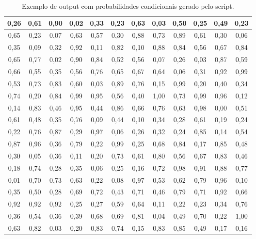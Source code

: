 \begin{table}[H]
\caption{Exemplo de output com probabilidades condicionais gerado pelo script.}
\label{q.output1}
\centering

\begin{tabular}{|c|c|c|c|c|c|c|c|c|c|c|c|}
\hline
0,26 & 0,61 & 0,90 & 0,02 & 0,33 & 0,23 & 0,63 & 0,03 & 0,50 & 0,25 & 0,49 & 0,23 \\ \hline
0,65 & 0,23 & 0,07 & 0,63 & 0,57 & 0,30 & 0,88 & 0,73 & 0,89 & 0,61 & 0,30 & 0,06 \\ \hline
0,35 & 0,09 & 0,32 & 0,92 & 0,11 & 0,82 & 0,10 & 0,88 & 0,84 & 0,56 & 0,67 & 0,84 \\ \hline
0,65 & 0,77 & 0,02 & 0,90 & 0,84 & 0,52 & 0,56 & 0,07 & 0,26 & 0,03 & 0,87 & 0,59 \\ \hline
0,66 & 0,55 & 0,35 & 0,56 & 0,76 & 0,65 & 0,67 & 0,64 & 0,06 & 0,31 & 0,92 & 0,99 \\ \hline
0,53 & 0,73 & 0,83 & 0,60 & 0,03 & 0,89 & 0,76 & 0,15 & 0,99 & 0,20 & 0,40 & 0,34 \\ \hline
0,74 & 0,20 & 0,84 & 0,99 & 0,95 & 0,56 & 0,40 & 1,00 & 0,73 & 0,99 & 0,96 & 0,12 \\ \hline
0,14 & 0,83 & 0,46 & 0,95 & 0,44 & 0,86 & 0,66 & 0,76 & 0,63 & 0,98 & 0,00 & 0,51 \\ \hline
0,61 & 0,48 & 0,35 & 0,76 & 0,09 & 0,44 & 0,10 & 0,34 & 0,28 & 0,61 & 0,19 & 0,24 \\ \hline
0,22 & 0,76 & 0,87 & 0,29 & 0,97 & 0,06 & 0,26 & 0,32 & 0,24 & 0,85 & 0,14 & 0,54 \\ \hline
0,87 & 0,96 & 0,36 & 0,79 & 0,22 & 0,99 & 0,25 & 0,68 & 0,84 & 0,17 & 0,85 & 0,48 \\ \hline
0,30 & 0,05 & 0,36 & 0,11 & 0,20 & 0,73 & 0,61 & 0,80 & 0,56 & 0,67 & 0,83 & 0,46 \\ \hline
0,18 & 0,74 & 0,28 & 0,35 & 0,06 & 0,25 & 0,16 & 0,72 & 0,98 & 0,91 & 0,88 & 0,77 \\ \hline
0,01 & 0,70 & 0,73 & 0,63 & 0,22 & 0,08 & 0,97 & 0,53 & 0,62 & 0,79 & 0,96 & 0,10 \\ \hline
0,35 & 0,50 & 0,28 & 0,69 & 0,72 & 0,43 & 0,71 & 0,46 & 0,79 & 0,71 & 0,92 & 0,66 \\ \hline
0,92 & 0,92 & 0,92 & 0,25 & 0,27 & 0,59 & 0,64 & 0,11 & 0,22 & 0,23 & 0,34 & 0,76 \\ \hline
0,36 & 0,54 & 0,36 & 0,39 & 0,68 & 0,69 & 0,81 & 0,04 & 0,49 & 0,70 & 0,22 & 1,00 \\ \hline
0,63 & 0,82 & 0,03 & 0,20 & 0,83 & 0,74 & 0,15 & 0,83 & 0,85 & 0,49 & 0,17 & 0,16 \\ \hline

\end{tabular}
\end{table}
